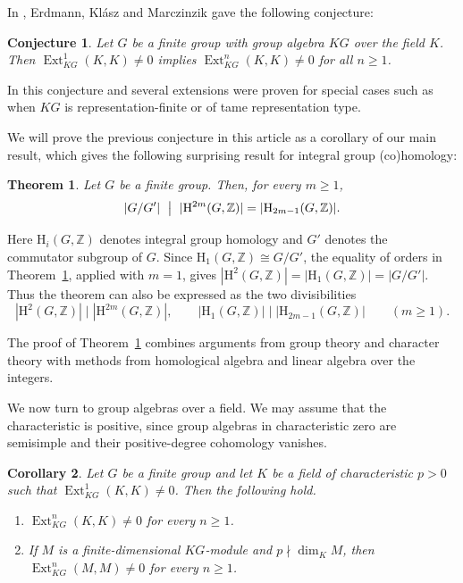 \documentclass[11pt,a4paper]{amsart}
\newtheorem{thmintroduction}{Theorem}
\newtheorem{corintroduction}[thmintroduction]{Corollary}
\newtheorem{conjectureintro}{Conjecture}
\numberwithin{equation}{section}
\DeclareMathOperator{\Ext}{Ext}
\newcommand{\HH}{\mathrm H}
\newcommand{\Z}{\mathbb Z}
\begin{document}
In \cite[Conjecture K~2.11]{EKM}, Erdmann, Kl\'asz and Marczinzik gave the following conjecture:
\begin{conjectureintro}
Let $G$ be a finite group with group algebra $KG$ over the field $K$. Then $\Ext^1_{KG}(K,K)\neq0$ implies
$\Ext^n_{KG}(K,K)\neq0$ for all $n\geq1$.
\end{conjectureintro}
In \cite{EKM} this conjecture and several extensions were proven for special cases such as when $KG$ is representation-finite or of tame representation type.

We will prove the previous conjecture in this article as a corollary of our main result, which gives the following surprising result for integral group (co)homology:
\begin{thmintroduction}\label{thm:main}
Let $G$ be a finite group. Then, for every $m\geq1$,
\[
 |G/G'|\ \bigm|\ |\HH^{2m}(G,\Z)|
       =|\HH_{2m-1}(G,\Z)|.
\]
\end{thmintroduction}

Here $\HH_i(G,\Z)$ denotes integral group homology and $G'$ denotes the commutator subgroup of $G$. Since
$\HH_1(G,\Z)\cong G/G'$, the equality of orders in
Theorem~\ref{thm:main}, applied with $m=1$, gives
$|\HH^2(G,\Z)|=|\HH_1(G,\Z)|=|G/G'|$. Thus the theorem
can also be expressed as the two divisibilities
\[
 |\HH^2(G,\Z)|\mid|\HH^{2m}(G,\Z)|,
 \qquad
 |\HH_1(G,\Z)|\mid|\HH_{2m-1}(G,\Z)|
 \qquad(m\geq1).
\]

The proof of Theorem~\ref{thm:main} combines arguments from group theory and character theory with methods from homological algebra and linear algebra over the integers.

We now turn to group algebras over a field. We may assume that
the characteristic is positive, since group algebras in
characteristic zero are semisimple and their positive-degree
cohomology vanishes.

\begin{corintroduction}\label{cor:modules}
Let $G$ be a finite group and let $K$ be a field of characteristic
$p>0$ such that $\Ext^1_{KG}(K,K)\neq0$. Then the following hold.
\begin{enumerate}
\item $\Ext^n_{KG}(K,K)\neq0$ for every $n\geq1$.
\item If $M$ is a finite-dimensional $KG$-module and
$p\nmid\dim_K M$, then $\Ext^n_{KG}(M,M)\neq0$ for every $n\geq1$.
\end{enumerate}
\end{corintroduction}
\end{document}
